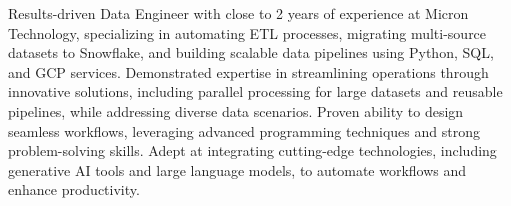 Results-driven Data Engineer with close to 2 years of experience at Micron Technology, specializing in automating ETL processes, migrating multi-source datasets to Snowflake, and building scalable data pipelines using Python, SQL, and GCP services. Demonstrated expertise in streamlining operations through innovative solutions, including parallel processing for large datasets and reusable pipelines, while addressing diverse data scenarios. Proven ability to design seamless workflows, leveraging advanced programming techniques and strong problem-solving skills. Adept at integrating cutting-edge technologies, including generative AI tools and large language models, to automate workflows and enhance productivity.


